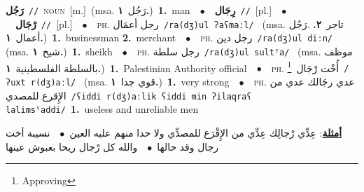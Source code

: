\documentclass[10pt,a4paper,twoside]{article} %
\begin{document}
\begin{multicols}{2}
{\setlength\topsep{0pt}\textbf{\foreignlanguage{arabic}{رَجُل}}\ {\color{gray}\texttt{//}\color{black}}\ \textsc{noun}\ [m.]\ \color{gray}(msa. \foreignlanguage{arabic}{رَجُل}~\foreignlanguage{arabic}{\textbf{١.}})\color{black}\ \textbf{1.}~man\ \ $\bullet$\ \ \setlength\topsep{0pt}\textbf{\foreignlanguage{arabic}{رِجَال}}\ {\color{gray}\texttt{//}\color{black}}\ [pl.]\ \ $\bullet$\ \ \setlength\topsep{0pt}\textbf{\foreignlanguage{arabic}{رْجَال}}\ {\color{gray}\texttt{//}\color{black}}\ [pl.]\ \ $\bullet$\ \ \textsc{ph.} \color{gray} \foreignlanguage{arabic}{رجل أعمَال}\color{black}\ {\color{gray}\texttt{/{\sffamily ra(dʒ)ul ʔaʕmaːl}/}\color{black}}\ \color{gray} (msa. \foreignlanguage{arabic}{تاجر}~\foreignlanguage{arabic}{\textbf{٢.}}  .\foreignlanguage{arabic}{رَجُل أعمال}~\foreignlanguage{arabic}{\textbf{١.}})\color{black}\ \textbf{1.}~businessman  \textbf{2.}~merchant\ \ $\bullet$\ \ \textsc{ph.} \color{gray} \foreignlanguage{arabic}{رجل دين}\color{black}\ {\color{gray}\texttt{/{\sffamily ra(dʒ)ul diːn}/}\color{black}}\ \color{gray} (msa. \foreignlanguage{arabic}{شيخ}~\foreignlanguage{arabic}{\textbf{١.}})\color{black}\ \textbf{1.}~sheikh\ \ $\bullet$\ \ \textsc{ph.} \color{gray} \foreignlanguage{arabic}{رجل سلطة}\color{black}\ {\color{gray}\texttt{/{\sffamily ra(dʒ)ul sultˤa}/}\color{black}}\ \color{gray} (msa. \foreignlanguage{arabic}{موظف بالسلطة الفلسطينية}~\foreignlanguage{arabic}{\textbf{١.}})\color{black}\ \textbf{1.}~Palestinian Authority official\ \ $\bullet$\ \ \textsc{ph.} \color{gray} \foreignlanguage{arabic}{أُخْت رْجَال}\color{black}\ \footnote{Approving}\ {\color{gray}\texttt{/{\sffamily ʔuxt r(dʒ)aːl}/}\color{black}}\ \color{gray} (msa. \foreignlanguage{arabic}{قوي جدا}~\foreignlanguage{arabic}{\textbf{١.}})\color{black}\ \textbf{1.}~very strong\ \ $\bullet$\ \ \textsc{ph.} \color{gray} \foreignlanguage{arabic}{عدي رجَالك عدي من الإِقرع للمصدي}\color{black}\ {\color{gray}\texttt{/{\sffamily ʕiddi r(dʒ)aːlik ʕiddi min ʔilaqraʕ lalimsˤaddi}/}\color{black}}\ \textbf{1.}~useless and unreliable men\  \begin{flushright}\color{gray}\foreignlanguage{arabic}{\textbf{\underline{\foreignlanguage{arabic}{أمثلة}}}: عِدِّي رْجالِك عِدِّي من الإِقْرَع للمصدِّي ولا حدا منهم عليه العين\ $\bullet$\ \  نسيبة أخت رجال وقد حالها\ $\bullet$\ \  والله كل رْجال ريحا بعبوش عينها}\end{flushright}\color{black}} \vspace{2mm}


\end{multicols}
\end{document}
